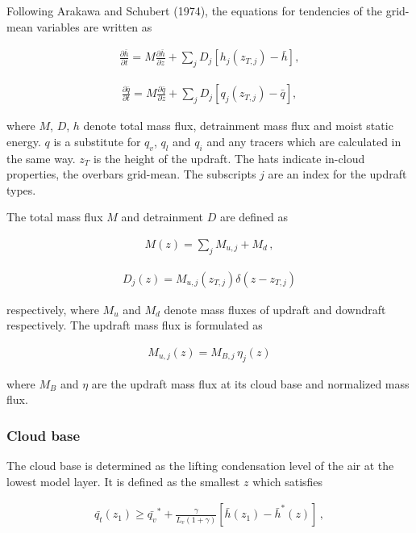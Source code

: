 Following Arakawa and Schubert (1974), the equations for tendencies of
the grid-mean variables are written as

\begin{eqnarray}
 \frac{\partial \bar{h}}{\partial t} = M \frac{\partial \bar{h}}{\partial z} + \sum_j D_j \left[ h_j(z_{T,j}) - \bar{h} \right],
\end{eqnarray}

\begin{eqnarray}
 \frac{\partial \bar{q}}{\partial t} = M\frac{\partial \bar{q}}{\partial z} + \sum_j D_j \left[ q_j(z_{T,j}) - \bar{q} \right],
\end{eqnarray}

where \(M\), \(D\), \(h\) denote total mass flux, detrainment mass flux
and moist static energy. \(q\) is a substitute for \(q_v\), \(q_l\) and
\(q_i\) and any tracers which are calculated in the same way. \(z_T\) is
the height of the updraft. The hats indicate in-cloud properties, the
overbars grid-mean. The subscripts \(j\) are an index for the updraft
types.

The total mass flux \(M\) and detrainment \(D\) are defined as

\begin{eqnarray}
M(z) = \sum_j M_{u,j} + M_d \, ,
\end{eqnarray}

\begin{eqnarray}
 D_j(z) = M_{u,j}(z_{T,j}) \delta (z-z_{T,j})
\end{eqnarray}

respectively, where \(M_u\) and \(M_d\) denote mass fluxes of updraft
and downdraft respectively. The updraft mass flux is formulated as

\begin{eqnarray}
 M_{u,j}(z) = M_{B,j} \, \eta_j(z)
\end{eqnarray}

where \(M_B\) and \(\eta\) are the updraft mass flux at its cloud base
and normalized mass flux.

\hypertarget{cloud-base}{%
\subsubsection{Cloud base}\label{cloud-base}}

The cloud base is determined as the lifting condensation level of the
air at the lowest model layer. It is defined as the smallest \(z\) which
satisfies

\begin{eqnarray}
  \bar{q_t}(z_1) \geq \bar{q_v}^* + \frac{\gamma}{L_v(1+\gamma)} \left[\bar{h}(z_1)-\bar{h}^*(z) \right]\,,
\end{eqnarray}

